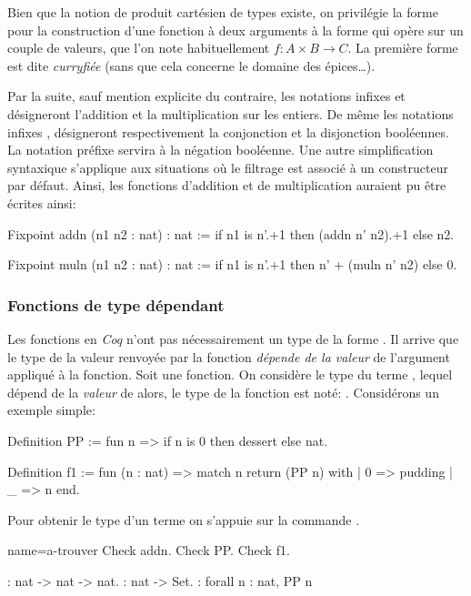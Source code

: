 \documentclass[a4paper,10pt]{article}
\begin{document}
Bien que la notion de produit cartésien de types existe, on privilégie la forme  pour la
construction d'une fonction à deux arguments à la forme qui opère sur un couple de valeurs, que l'on note
habituellement \(f : A \times B \longrightarrow C\).  La première forme est dite \emph{curryfiée}
(sans que cela concerne le domaine des épices\ldots{}).

Par la suite, sauf mention explicite du contraire, les notations infixes \C{+} et \C{*} désigneront
l'addition et la multiplication sur les entiers.  De même les notations infixes \C{&&}, \C{||} désigneront
respectivement la conjonction et la disjonction booléennes.  La notation préfixe \C{\~\~} servira à la
négation booléenne.  Une autre simplification syntaxique s'applique aux situations où le filtrage est
associé à un constructeur par défaut.  Ainsi, les fonctions d'addition et de multiplication auraient pu être
écrites ainsi:

\begin{coq}[]
Fixpoint addn (n1 n2 : nat) : nat :=
  if n1 is n'.+1 then (addn n' n2).+1 else n2.

Fixpoint muln (n1 n2 : nat) : nat :=
  if n1 is n'.+1 then n' + (muln n' n2) else 0.
\end{coq}


\subsubsection{Fonctions de type dépendant}
\label{sec:org357fd16}
Les fonctions en \emph{Coq} n'ont pas nécessairement un type de la forme .  Il arrive que le type de la
valeur renvoyée par la fonction \emph{dépende de la valeur} de l'argument appliqué à la fonction.  Soit  une
fonction.  On considère  le type du terme , lequel dépend de la \emph{valeur} de  alors, le
type de la fonction est noté: .  Considérons un exemple simple:

\begin{coq}[]
Definition PP := fun n => if n is 0 then dessert else nat.

Definition f1 := fun (n : nat) =>
  match n return (PP n) with
  | 0 => pudding
  | _ => n
  end.
\end{coq}

Pour obtenir le type d'un terme on s'appuie sur la commande .

\begin{coq-left}{name=a-trouver}{}
Check addn.
Check PP.
Check f1.
\end{coq-left}
\hfill
\begin{coqout-right}
: nat -> nat -> nat.
: nat -> Set.
: forall n : nat, PP n
\end{coqout-right}
\end{document}

